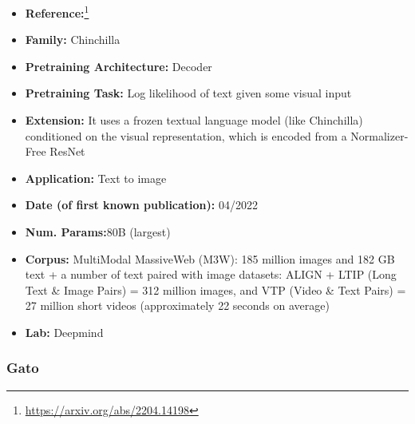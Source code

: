\documentclass{article}
\begin{document}
            \begin{itemize}
                \item \textbf{Reference:}\footnote{\url{https://arxiv.org/abs/2204.14198}}\cite{alayrac2022flamingo}
                \item \textbf{Family:} Chinchilla 
                \item \textbf{Pretraining Architecture:} Decoder
                \item \textbf{Pretraining Task:} Log likelihood of text given some visual input
                \item \textbf{Extension:} It uses a frozen textual language model (like Chinchilla) conditioned on the visual representation, which is encoded from a Normalizer-Free ResNet  
                \item \textbf{Application:} Text to image
                \item \textbf{Date (of first known publication):} 04/2022
                \item \textbf{Num. Params:}80B (largest)
                \item \textbf{Corpus:} MultiModal MassiveWeb (M3W): 185 million images and 182 GB text + a number of text paired with image datasets: ALIGN + LTIP (Long Text \& Image Pairs) = 312 million images, and VTP (Video \& Text Pairs) = 27 million short videos (approximately 22 seconds on average)
                \item \textbf{Lab:} Deepmind
            \end{itemize}
            
\subsubsection{Gato}
\end{document}

